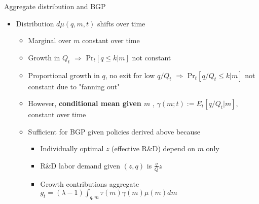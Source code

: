 \documentclass[english,usenames,dvipsnames]{beamer}
\begin{document}
\begin{frame}{Aggregate distribution and BGP}\label{aggregate_distribution_and_bgp}
\hyperlink{closing_the_model}{}
\begin{itemize}
	\item Distribution $d\mu(q,m,t)$ shifts over time
	\begin{itemize}
		\item Marginal over $m$ constant over time
		\item Growth in $Q_t$ $\Rightarrow$ $\textrm{Pr}_t[q \le k | m]$ not constant
		\item Proportional growth in $q$, no exit for low $q/Q_t$ $\Rightarrow$ $\textrm{Pr}_t[q /Q_t\le k | m]$ not constant due to "fanning out"
		\item However, \textbf{\alert{conditional mean given $m$}} , $\gamma(m;t) := E_t[q/Q_t | m]$, constant over time
		\item Sufficient for BGP given policies derived above because
		\begin{itemize}
			\item Individually optimal $z$ (effective R\&D) depend on $m$ only
			\item R\&D labor demand given $(z,q)$ is $\frac{q}{Q}z$
			\item Growth contributions aggregate $g_t = (\lambda -1)\int_{q,m} \tau(m) \gamma(m) \mu(m) dm$
		\end{itemize}
	\end{itemize}
\end{itemize}
\end{frame}
\end{document}
